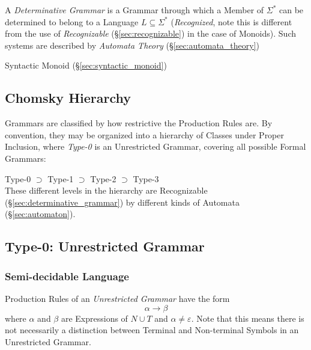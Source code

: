 A \emph{Determinative Grammar} is a Grammar through which a Member of
$\Sigma^*$ can be determined to belong to a Language $L \subseteq
\Sigma^*$ (\emph{Recognized}, note this is different from the use of
\emph{Recognizable} (\S\ref{sec:recognizable}) in the case of
Monoids). Such systems are described by \emph{Automata Theory}
(\S\ref{sec:automata_theory})

Syntactic Monoid (\S\ref{sec:syntactic_monoid})



\subsection{Chomsky Hierarchy}\label{sec:chomsky_hierarchy}
\cite{chomsky56}

Grammars are classified by how restrictive the Production Rules are.
By convention, they may be organized into a hierarchy of Classes under
Proper Inclusion, where \emph{Type-0} is an Unrestricted Grammar,
covering all possible Formal Grammars:

  Type-0 $\supset$ Type-1 $\supset$ Type-2 $\supset$ Type-3 \\
These different levels in the hierarchy are Recognizable
(\S\ref{sec:determinative_grammar}) by different kinds of Automata
(\S\ref{sec:automaton}).



\subsection{Type-0: Unrestricted Grammar}\label{sec:unrestricted_grammar}

\subsubsection{Semi-decidable Language}\label{sec:semidecidable}

Production Rules of an \emph{Unrestricted Grammar} have the form
\[
  \alpha \rightarrow \beta
\]
where $\alpha$ and $\beta$ are Expressions of $N \cup T$ and $\alpha
\neq \varepsilon$. Note that this means there is not necessarily a
distinction between Terminal and Non-terminal Symbols in an
Unrestricted Grammar.

